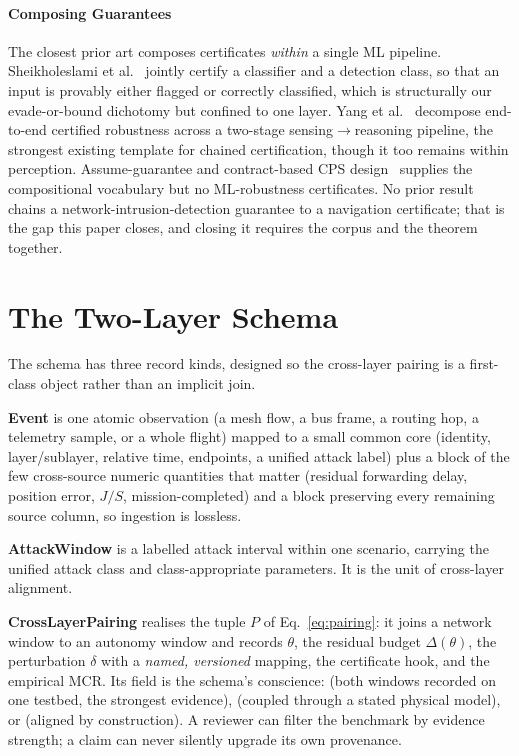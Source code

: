 \paragraph{Composing Guarantees}
The closest prior art composes certificates \emph{within} a single ML pipeline.
Sheikholeslami et al.~\cite{sheikholeslami2021provably} jointly certify a
classifier and a detection class, so that an input is provably either flagged or
correctly classified, which is structurally our evade-or-bound dichotomy but
confined to one layer. Yang et al.~\cite{yang2022sensing} decompose end-to-end certified
robustness across a two-stage sensing$\to$reasoning pipeline, the strongest
existing template for chained certification, though it too remains within
perception. Assume-guarantee and contract-based CPS design~\cite{pacti2024}
supplies the compositional vocabulary but no ML-robustness certificates. No
prior result chains a network-intrusion-detection guarantee to a navigation
certificate; that is the gap this paper closes, and closing it requires the
corpus and the theorem together.

\section{The Two-Layer Schema}
\label{sec:schema}
The schema has three record kinds, designed so the cross-layer pairing is a
first-class object rather than an implicit join.

\textbf{Event} is one atomic observation (a mesh flow, a bus frame, a routing
hop, a telemetry sample, or a whole flight) mapped to a small common core
(identity, layer/sublayer, relative time, endpoints, a unified attack label)
plus a  block of the few cross-source numeric quantities that
matter (residual forwarding delay, position error, $J/S$, mission-completed) and
a  block preserving every remaining source column, so ingestion is
lossless.

\textbf{AttackWindow} is a labelled attack interval within one scenario,
carrying the unified attack class and class-appropriate 
parameters. It is the unit of cross-layer alignment.

\textbf{CrossLayerPairing} realises the tuple $P$ of Eq.~\eqref{eq:pairing}: it
joins a network window to an autonomy window and records $\theta$, the residual
budget $\Delta(\theta)$, the perturbation $\delta$ with a \emph{named,
versioned} mapping, the certificate hook, and the empirical MCR. Its
 field is the schema's conscience:
 (both windows recorded on one testbed, the
strongest evidence),  (coupled through a stated physical
model), or  (aligned by construction). A reviewer can
filter the benchmark by evidence strength; a claim can never silently upgrade
its own provenance.

